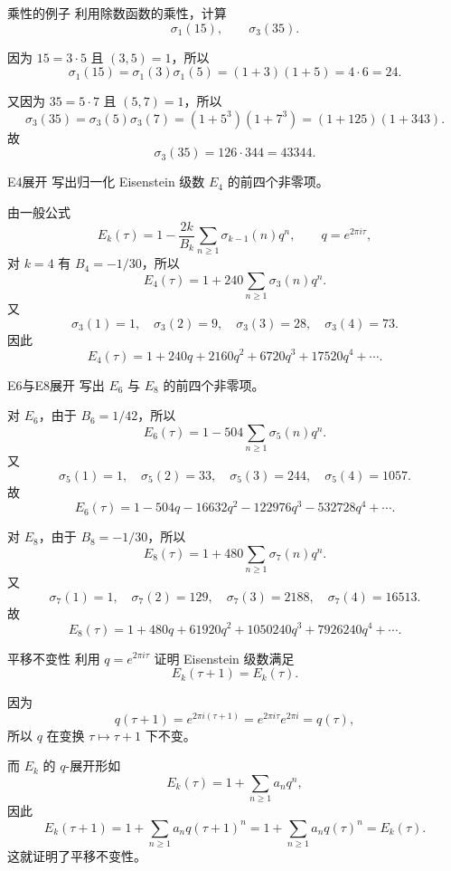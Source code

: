 \begin{problem}{乘性的例子}
\easy
利用除数函数的乘性，计算
\[
\sigma_1(15),\qquad \sigma_3(35).
\]
\end{problem}
\begin{solution}
因为 $15=3\cdot 5$ 且 $(3,5)=1$，所以
\[
\sigma_1(15)=\sigma_1(3)\sigma_1(5)=(1+3)(1+5)=4\cdot 6=24.
\]

又因为 $35=5\cdot 7$ 且 $(5,7)=1$，所以
\[
\sigma_3(35)=\sigma_3(5)\sigma_3(7)=(1+5^3)(1+7^3)=(1+125)(1+343).
\]
故
\[
\sigma_3(35)=126\cdot 344=43344.
\]
\end{solution}

\begin{problem}{E4展开}
\easy
写出归一化 Eisenstein 级数 $E_4$ 的前四个非零项。
\end{problem}
\begin{solution}
由一般公式
\[
E_k(\tau)=1-\frac{2k}{B_k}\sum_{n\ge 1}\sigma_{k-1}(n)q^n,
\qquad q=e^{2\pi i\tau},
\]
对 $k=4$ 有 $B_4=-1/30$，所以
\[
E_4(\tau)=1+240\sum_{n\ge1}\sigma_3(n)q^n.
\]
又
\[
\sigma_3(1)=1,\quad \sigma_3(2)=9,\quad \sigma_3(3)=28,\quad \sigma_3(4)=73.
\]
因此
\[
E_4(\tau)=1+240q+2160q^2+6720q^3+17520q^4+\cdots.
\]
\end{solution}

\begin{problem}{E6与E8展开}
\easy
写出 $E_6$ 与 $E_8$ 的前四个非零项。
\end{problem}
\begin{solution}
对 $E_6$，由于 $B_6=1/42$，所以
\[
E_6(\tau)=1-504\sum_{n\ge1}\sigma_5(n)q^n.
\]
又
\[
\sigma_5(1)=1,\quad \sigma_5(2)=33,\quad \sigma_5(3)=244,\quad \sigma_5(4)=1057.
\]
故
\[
E_6(\tau)=1-504q-16632q^2-122976q^3-532728q^4+\cdots.
\]

对 $E_8$，由于 $B_8=-1/30$，所以
\[
E_8(\tau)=1+480\sum_{n\ge1}\sigma_7(n)q^n.
\]
又
\[
\sigma_7(1)=1,\quad \sigma_7(2)=129,\quad \sigma_7(3)=2188,\quad \sigma_7(4)=16513.
\]
故
\[
E_8(\tau)=1+480q+61920q^2+1050240q^3+7926240q^4+\cdots.
\]
\end{solution}

\begin{problem}{平移不变性}
\easy
利用 $q=e^{2\pi i\tau}$ 证明 Eisenstein 级数满足
\[
E_k(\tau+1)=E_k(\tau).
\]
\end{problem}
\begin{solution}
因为
\[
q(\tau+1)=e^{2\pi i(\tau+1)}=e^{2\pi i\tau}e^{2\pi i}=q(\tau),
\]
所以 $q$ 在变换 $\tau\mapsto \tau+1$ 下不变。

而 $E_k$ 的 $q$-展开形如
\[
E_k(\tau)=1+\sum_{n\ge1} a_n q^n,
\]
因此
\[
E_k(\tau+1)=1+\sum_{n\ge1} a_n q(\tau+1)^n
=1+\sum_{n\ge1} a_n q(\tau)^n
=E_k(\tau).
\]
这就证明了平移不变性。
\end{solution}

